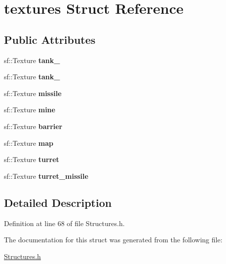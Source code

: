 \hypertarget{structtextures}{\section{textures Struct Reference}
\label{structtextures}
}
\subsection*{Public Attributes}
\begin{DoxyCompactItemize}
\item 
\hypertarget{structtextures_a9287e247a5d108ed875b7b5b89ded524}{sf\+::\+Texture {\bfseries tank\+\_}}\label{structtextures_a9287e247a5d108ed875b7b5b89ded524}

\item 
\hypertarget{structtextures_a3322b3f064640afe1a4ebdb53636b71d}{sf\+::\+Texture {\bfseries tank\+\_}}\label{structtextures_a3322b3f064640afe1a4ebdb53636b71d}

\item 
\hypertarget{structtextures_a1d12557e92da80a9809f037edfe72f2f}{sf\+::\+Texture {\bfseries missile}}\label{structtextures_a1d12557e92da80a9809f037edfe72f2f}

\item 
\hypertarget{structtextures_a7f5b6643fd47d1bd8d5758c24c32dc9e}{sf\+::\+Texture {\bfseries mine}}\label{structtextures_a7f5b6643fd47d1bd8d5758c24c32dc9e}

\item 
\hypertarget{structtextures_a36f35bd26858ecc8eb507e1072bfad7d}{sf\+::\+Texture {\bfseries barrier}}\label{structtextures_a36f35bd26858ecc8eb507e1072bfad7d}

\item 
\hypertarget{structtextures_a703e4f064d67c1cee84ba8560a6104c6}{sf\+::\+Texture {\bfseries map}}\label{structtextures_a703e4f064d67c1cee84ba8560a6104c6}

\item 
\hypertarget{structtextures_a8454a0f97657e68ca0076f19c4de6236}{sf\+::\+Texture {\bfseries turret}}\label{structtextures_a8454a0f97657e68ca0076f19c4de6236}

\item 
\hypertarget{structtextures_aa9ff61d80b32b3520308d8df61a8ea3f}{sf\+::\+Texture {\bfseries turret\+\_\+missile}}\label{structtextures_aa9ff61d80b32b3520308d8df61a8ea3f}

\end{DoxyCompactItemize}


\subsection{Detailed Description}


Definition at line 68 of file Structures.\+h.



The documentation for this struct was generated from the following file\+:\begin{DoxyCompactItemize}
\item 
\hyperlink{_structures_8h}{Structures.\+h}\end{DoxyCompactItemize}
